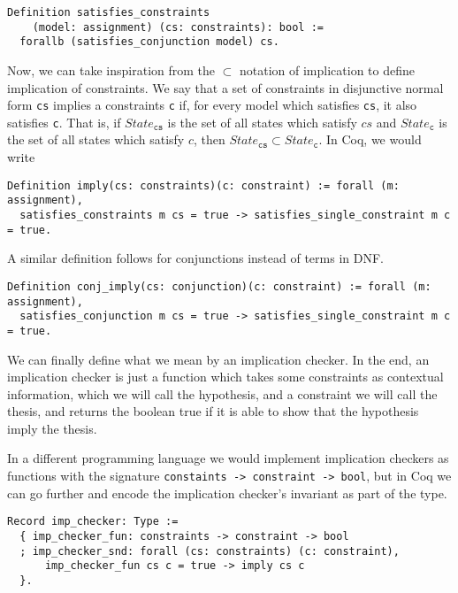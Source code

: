 \begin{verbatim}
Definition satisfies_constraints 
    (model: assignment) (cs: constraints): bool :=
  forallb (satisfies_conjunction model) cs.
\end{verbatim}

Now, we can take inspiration from the $\subset$ notation of implication to define implication of 
constraints. We say that a set of constraints in disjunctive normal form \texttt{cs} implies a constraints \texttt{c} if,
for every model which satisfies \texttt{cs}, it also satisfies \texttt{c}. That is, if $State_{\texttt{cs}}$ is the set of
all states which satisfy $cs$ and $State_{\texttt{c}}$ is the set of all states which satisfy $c$, then
$State_{\texttt{cs}} \subset State_{\texttt{c}}$. In Coq, we would write

\begin{verbatim}
Definition imply(cs: constraints)(c: constraint) := forall (m: assignment),
  satisfies_constraints m cs = true -> satisfies_single_constraint m c = true.
\end{verbatim}

A similar definition follows for conjunctions instead of terms in DNF.
\begin{verbatim}
Definition conj_imply(cs: conjunction)(c: constraint) := forall (m: assignment),
  satisfies_conjunction m cs = true -> satisfies_single_constraint m c = true.
\end{verbatim}

We can finally define what we mean by an implication checker. In the end, an implication checker is 
just a function which takes some constraints as contextual information, which we will call the 
hypothesis, and a constraint we will call the thesis, and returns the boolean true if it is able to 
show that the hypothesis imply the thesis.

In a different programming language we would implement implication checkers as functions with the 
signature \texttt{constaints -> constraint -> bool}, but in Coq we can go further and encode 
the implication checker's invariant as part of the type.

\begin{verbatim}
Record imp_checker: Type := 
  { imp_checker_fun: constraints -> constraint -> bool
  ; imp_checker_snd: forall (cs: constraints) (c: constraint),
      imp_checker_fun cs c = true -> imply cs c
  }.
\end{verbatim}

